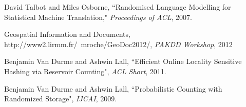 \documentclass[11pt]{article}
\begin{document}
\begin{footnotesize}

\begin{thebibliography}{}


 {\sc David Talbot and Miles Osborne}, ``Randomised Language Modelling for Statistical Machine Translation," \textit{Proceedings of ACL}, 2007.

 Geospatial Information and Documents, http://www2.lirmm.fr/~mroche/GeoDoc2012/, \textit{PAKDD Workshop}, 2012

 {\sc Benjamin Van Durme and Ashwin Lall}, ``Efficient Online Locality Sensitive Hashing via Reservoir Counting", \textit{ACL Short}, 2011.

 {\sc Benjamin Van Durme and Ashwin Lall}, ``Probabilistic Counting with Randomized Storage", \textit{IJCAI}, 2009.

\end{thebibliography}
\end{footnotesize}
\end{document}
